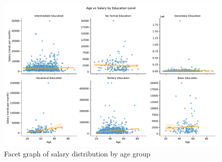 \begin{figure}[H]
    \centering
    \includegraphics[width=\columnwidth]{images/hyp_3_facet.pdf} %
    \caption{Facet graph of salary distribution by age group}
    \label{fig:salary distribution facet}
\end{figure}
